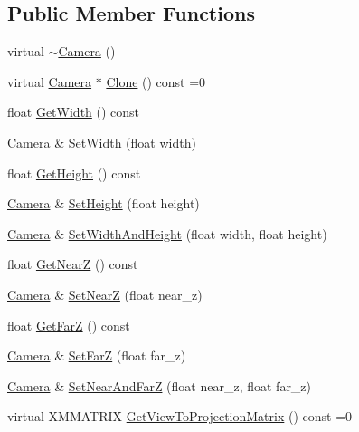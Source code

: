 \subsection*{Public Member Functions}
\begin{DoxyCompactItemize}
\item 
virtual \hyperlink{classmage_1_1_camera_ae56c0542ae1a480c7fb15d737bf16de0}{$\sim$\+Camera} ()
\item 
virtual \hyperlink{classmage_1_1_camera}{Camera} $\ast$ \hyperlink{classmage_1_1_camera_a19301c2256c183db50b5e9406f7b5f3c}{Clone} () const =0
\item 
float \hyperlink{classmage_1_1_camera_a2285655605035118861297b2449a3443}{Get\+Width} () const
\item 
\hyperlink{classmage_1_1_camera}{Camera} \& \hyperlink{classmage_1_1_camera_acddfb1108ee8f7e937833286c082dadf}{Set\+Width} (float width)
\item 
float \hyperlink{classmage_1_1_camera_a4c6c5e96085651ce29cd6e87543d21ec}{Get\+Height} () const
\item 
\hyperlink{classmage_1_1_camera}{Camera} \& \hyperlink{classmage_1_1_camera_a83ab1d3345b3fc318608c016b6b523d9}{Set\+Height} (float height)
\item 
\hyperlink{classmage_1_1_camera}{Camera} \& \hyperlink{classmage_1_1_camera_a275b6908662c0cde4fec5485ff04a846}{Set\+Width\+And\+Height} (float width, float height)
\item 
float \hyperlink{classmage_1_1_camera_a175e3c36526a8a3e28cd2f8bd1701c55}{Get\+NearZ} () const
\item 
\hyperlink{classmage_1_1_camera}{Camera} \& \hyperlink{classmage_1_1_camera_ae2e148f1ff5128442927abc87114a739}{Set\+NearZ} (float near\+\_\+z)
\item 
float \hyperlink{classmage_1_1_camera_a7f293a8711086b3419fe3b4224ff2778}{Get\+FarZ} () const
\item 
\hyperlink{classmage_1_1_camera}{Camera} \& \hyperlink{classmage_1_1_camera_acd1ab15368f052b846f72b92a52a94c5}{Set\+FarZ} (float far\+\_\+z)
\item 
\hyperlink{classmage_1_1_camera}{Camera} \& \hyperlink{classmage_1_1_camera_a8cb00dc1b8455197412c80f321011dc1}{Set\+Near\+And\+FarZ} (float near\+\_\+z, float far\+\_\+z)
\item 
virtual X\+M\+M\+A\+T\+R\+IX \hyperlink{classmage_1_1_camera_a1f5206864cf18b5548219492556df5d2}{Get\+View\+To\+Projection\+Matrix} () const =0
\end{DoxyCompactItemize}
